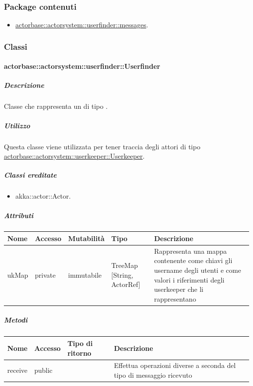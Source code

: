 \documentclass{scalatekids-article}
\begin{document}
\subsubsection{Package contenuti}
\begin{itemize}
\item \hyperref[sec:actorbase::actorsystem::userfinder::messages]{actorbase::actorsystem::userfinder::messages}.
\end{itemize}

\subsubsection{Classi}

\paragraph{actorbase::actorsystem::userfinder::Userfinder}
\label{sec:actorbase::actorsystem::userfinder::Userfinder}

\subparagraph{Descrizione}
Classe che rappresenta un  di tipo .

\subparagraph{Utilizzo}
Questa classe viene utilizzata per tener traccia degli attori di tipo
\hyperref[sec:actorbase::actorsystem::userkeeper::Userkeeper]{actorbase::actorsystem::userkeeper::Userkeeper}.

\subparagraph{Classi ereditate}
\begin{itemize}
\item akka::actor::Actor.
\end{itemize}

\subparagraph{Attributi}
\begin{tabular}{| p{3cm} | p{1.5cm} | p{2cm} | p{2cm} | p{8.5cm} |}
  \hline
  Nome & Accesso & Mutabilità & Tipo & Descrizione\\
  \hline
  ukMap & private & immutabile & TreeMap [String, ActorRef] & Rappresenta una mappa contenente come chiavi gli username degli utenti e come valori i riferimenti degli userkeeper che li rappresentano \\
  \hline
\end{tabular}

\subparagraph{Metodi}

\begin{tabular}{| l | l | l | l |}
  \hline
  Nome & Accesso & Tipo di ritorno & Descrizione\\
  \hline
  receive & public &  & Effettua operazioni diverse a seconda del tipo di messaggio ricevuto\\
  \hline
\end{tabular}
\end{document}
